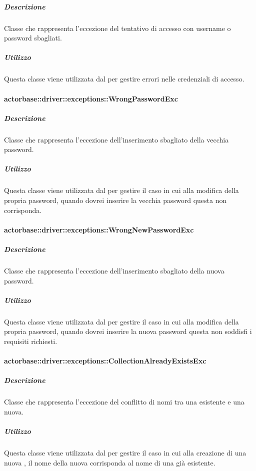 \documentclass{scalatekids-article}
\begin{document}
\subparagraph{Descrizione}

Classe che rappresenta l'eccezione del tentativo di accesso con username o password sbagliati.

\subparagraph{Utilizzo}

Questa classe viene utilizzata dal  per gestire errori nelle credenziali di accesso.


\paragraph{actorbase::driver::exceptions::WrongPasswordExc}

\subparagraph{Descrizione}

Classe che rappresenta l'eccezione dell'inserimento sbagliato della vecchia password.

\subparagraph{Utilizzo}

Questa classe viene utilizzata dal  per gestire il caso in cui alla modifica della propria password, quando dovrei inserire la vecchia password questa non corrisponda.

\paragraph{actorbase::driver::exceptions::WrongNewPasswordExc}

\subparagraph{Descrizione}

Classe che rappresenta l'eccezione dell'inserimento sbagliato della nuova password.

\subparagraph{Utilizzo}

Questa classe viene utilizzata dal  per gestire il caso in cui alla modifica della propria password, quando dovrei inserire la nuova password questa non soddisfi i requisiti richiesti.

\paragraph{actorbase::driver::exceptions::CollectionAlreadyExistsExc}

\subparagraph{Descrizione}

Classe che rappresenta l'eccezione del conflitto di nomi tra una  esistente e una nuova.

\subparagraph{Utilizzo}

Questa classe viene utilizzata dal  per gestire il caso in cui alla creazione di una nuova , il nome della nuova  corrisponda al nome di una  già esistente.
\end{document}
